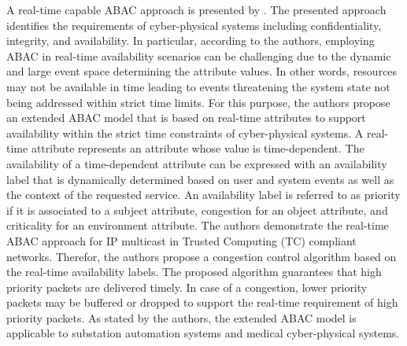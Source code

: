 A real-time capable ABAC approach is presented by \citeauthor{Burmester2013} \cite{Burmester2013}.
The presented approach identifies the requirements of cyber-physical systems including confidentiality, integrity, and availability.
In particular, according to the authors, employing ABAC in real-time availability scenarios can be challenging due to the dynamic and large event space determining the attribute values.
In other words, resources may not be available in time leading to events threatening the system state not being addressed within strict time limits.
For this purpose, the authors propose an extended ABAC model that is based on real-time attributes to support availability within the strict time constraints of cyber-physical systems.
A real-time attribute represents an attribute whose value is time-dependent.
The availability of a time-dependent attribute can be expressed with an availability label that is dynamically determined based on user and system events as well as the context of the requested service.
An availability label is referred to as priority if it is associated to a subject attribute, congestion for an object attribute, and criticality for an environment attribute.
The authors demonstrate the real-time ABAC approach for IP multicast in Trusted Computing (TC) compliant networks.
Therefor, the authors propose a congestion control algorithm based on the real-time availability labels.
The proposed algorithm guarantees that high priority packets are delivered timely.
In case of a congestion, lower priority packets may be buffered or dropped to support the real-time requirement of high priority packets.
As stated by the authors, the extended ABAC model is applicable to substation automation systems and medical cyber-physical systems.

